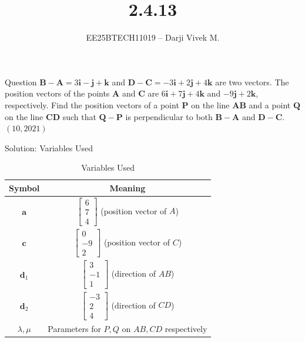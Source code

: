 \documentclass{beamer}
\title{2.4.13}
\author{EE25BTECH11019 -- Darji Vivek M.}
\date{}
\newcommand{\brak}[1]{\left( #1 \right)}
\renewcommand{\vec}[1]{\mathbf{#1}}
\begin{document}
\begin{frame}
  \titlepage
\end{frame}

\begin{frame}{Question}
$\vec{B}-\vec{A}=3\vec{i}-\vec{j}+\vec{k}$ and $\vec{D}-\vec{C}=-3\vec{i}+2\vec{j}+4\vec{k}$ are two vectors.  
The position vectors of the points $\vec{A}$ and $\vec{C}$ are $6\vec{i}+7\vec{j}+4\vec{k}$ and $-9\vec{j}+2\vec{k}$, respectively.  
Find the position vectors of a point $\vec{P}$ on the line $\vec{A}\vec{B}$ and a point $\vec{Q}$ on the line $\vec{C}\vec{D}$ such that $\vec{Q}-\vec{P}$ is perpendicular to both $\vec{B}-\vec{A}$ and $\vec{D}-\vec{C}$.  
\hfill $\brak{10,2021}$
\end{frame}

\begin{frame}{Solution: Variables Used}
\small
\begin{table}[h!]
\centering
\begin{tabular}{|c|c|}
\hline
Symbol & Meaning \\ \hline
$\vec{a}$ & $\begin{bmatrix}6\\7\\4\end{bmatrix}$ (position vector of $A$) \\ \hline
$\vec{c}$ & $\begin{bmatrix}0\\-9\\2\end{bmatrix}$ (position vector of $C$) \\ \hline
$\vec{d}_1$ & $\begin{bmatrix}3\\-1\\1\end{bmatrix}$ (direction of $AB$) \\ \hline
$\vec{d}_2$ & $\begin{bmatrix}-3\\2\\4\end{bmatrix}$ (direction of $CD$) \\ \hline
$\lambda,\mu$ & Parameters for $P,Q$ on $AB,CD$ respectively \\ \hline
\end{tabular}
\caption{Variables Used}
\end{table}
\end{frame}
\end{document}
